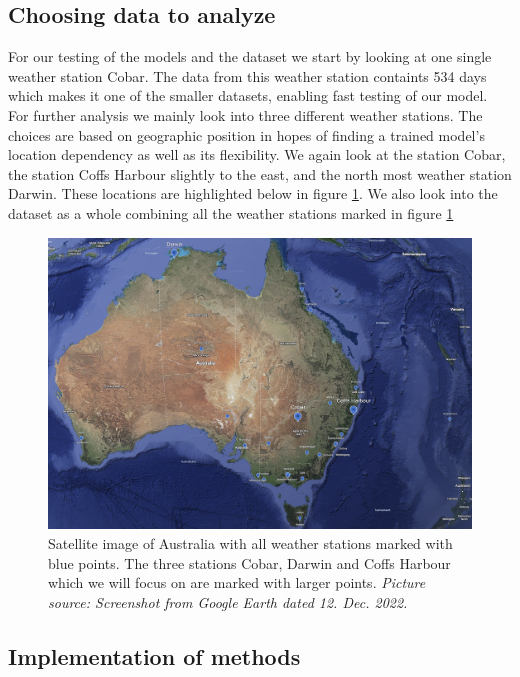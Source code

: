 \documentclass[11pt]{article}
\begin{document}
\subsection{Choosing data to analyze} %
\label{sub:Weather stations}
For our testing of the models and the dataset we start by looking at one single weather station Cobar. The data from this weather station containts 534 days which makes it one of the smaller datasets, enabling fast testing of our model. For further analysis we mainly look into three different weather stations. The choices are based on geographic position in hopes of finding a trained model's location dependency as well as its flexibility. We again look at the station Cobar, the station Coffs Harbour slightly to the east, and the north most weather station Darwin. These locations are highlighted below in figure \ref{fig:earth}. We also look into the dataset as a whole combining all the weather stations marked in figure \ref{fig:earth}
\begin{figure}[H]
    \centering
    \includegraphics[width=\textwidth]{../figures/earth.png}
    \caption{Satellite image of Australia with all weather stations marked with blue points. The three stations Cobar, Darwin and Coffs Harbour which we will focus on are marked with larger points. \textit{Picture source: Screenshot from Google Earth dated 12. Dec. 2022.}}
    \label{fig:earth}
\end{figure}

\subsection{Implementation of methods} %
\label{sub:Implementation of methods}
\end{document}

